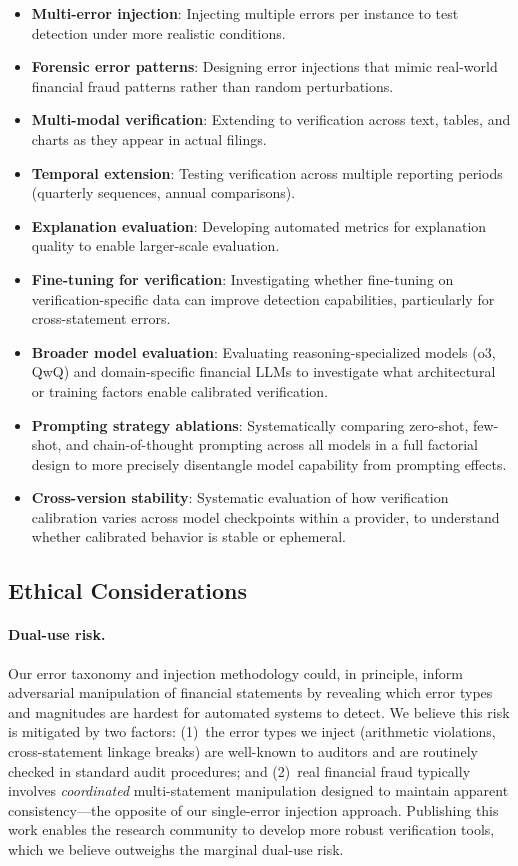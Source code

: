 \documentclass[11pt]{article}
\begin{document}
\begin{itemize}[topsep=2pt,itemsep=1pt]
    \item \textbf{Multi-error injection}: Injecting multiple errors per instance to test detection under more realistic conditions.
    \item \textbf{Forensic error patterns}: Designing error injections that mimic real-world financial fraud patterns rather than random perturbations.
    \item \textbf{Multi-modal verification}: Extending to verification across text, tables, and charts as they appear in actual filings.
    \item \textbf{Temporal extension}: Testing verification across multiple reporting periods (quarterly sequences, annual comparisons).
    \item \textbf{Explanation evaluation}: Developing automated metrics for explanation quality to enable larger-scale evaluation.
    \item \textbf{Fine-tuning for verification}: Investigating whether fine-tuning on verification-specific data can improve detection capabilities, particularly for cross-statement errors.
    \item \textbf{Broader model evaluation}: Evaluating reasoning-specialized models (o3, QwQ) and domain-specific financial LLMs to investigate what architectural or training factors enable calibrated verification.
    \item \textbf{Prompting strategy ablations}: Systematically comparing zero-shot, few-shot, and chain-of-thought prompting across all models in a full factorial design to more precisely disentangle model capability from prompting effects.
    \item \textbf{Cross-version stability}: Systematic evaluation of how verification calibration varies across model checkpoints within a provider, to understand whether calibrated behavior is stable or ephemeral.
\end{itemize}

\subsection{Ethical Considerations}
\label{sec:ethics}

\paragraph{Dual-use risk.}
Our error taxonomy and injection methodology could, in principle, inform adversarial manipulation of financial statements by revealing which error types and magnitudes are hardest for automated systems to detect.
We believe this risk is mitigated by two factors: (1)~the error types we inject (arithmetic violations, cross-statement linkage breaks) are well-known to auditors and are routinely checked in standard audit procedures; and (2)~real financial fraud typically involves \emph{coordinated} multi-statement manipulation designed to maintain apparent consistency---the opposite of our single-error injection approach.
Publishing this work enables the research community to develop more robust verification tools, which we believe outweighs the marginal dual-use risk.
\end{document}
